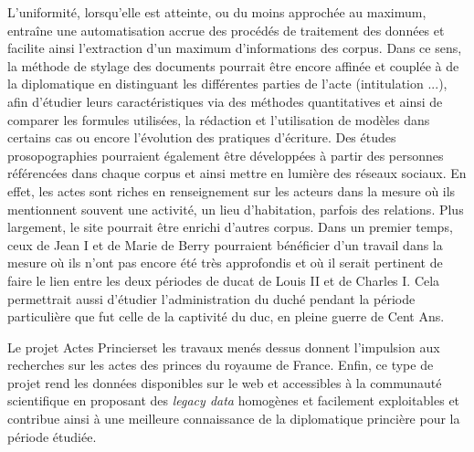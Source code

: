 \par L'uniformité, lorsqu'elle est atteinte, ou du moins approchée au maximum, entraîne une automatisation accrue des procédés de traitement des données et facilite ainsi l'extraction d'un maximum d'informations des corpus. Dans ce sens, la méthode de stylage des documents pourrait être encore affinée et couplée à de la diplomatique en distinguant les différentes parties de l'acte (intitulation ...), afin d'étudier leurs caractéristiques via des méthodes quantitatives et ainsi de comparer les formules utilisées, la rédaction et l'utilisation de modèles dans certains cas ou encore l'évolution des pratiques d'écriture. Des études prosopographies pourraient également être développées à partir des personnes référencées dans chaque corpus et ainsi mettre en lumière des réseaux sociaux. En effet, les actes sont riches en renseignement sur les acteurs dans la mesure où ils mentionnent souvent une activité, un lieu d'habitation, parfois des relations. Plus largement, le site pourrait être enrichi d'autres corpus. Dans un premier temps, ceux de Jean I et de Marie de Berry pourraient bénéficier d'un travail dans la mesure où ils n'ont pas encore été très approfondis et où il serait pertinent de faire le lien entre les deux périodes de ducat de Louis II et de Charles I. Cela permettrait aussi d'étudier l'administration du duché pendant la période particulière que fut celle de la captivité du duc, en pleine guerre de Cent Ans. 
\newline 

\par Le projet \og Actes Princiers\fg \space et les travaux menés dessus donnent l'impulsion aux recherches sur les actes des princes du royaume de France. Enfin, ce type de projet rend les données disponibles sur le web et accessibles à la communauté scientifique en proposant des \textit{legacy data} homogènes et facilement exploitables et contribue ainsi à une meilleure connaissance de la diplomatique princière pour la période étudiée.

\newpage
\thispagestyle{empty}
\mbox{}
\newpage